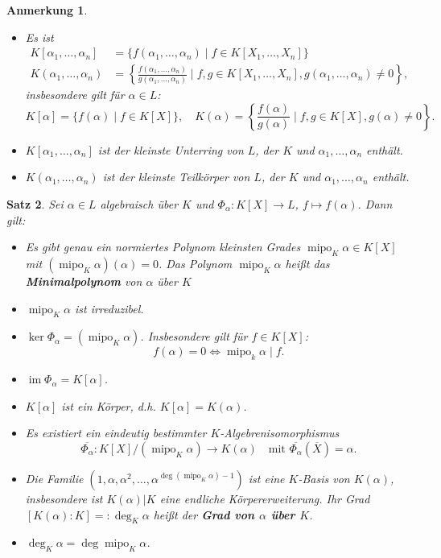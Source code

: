 \documentclass[a4paper, twoside, 11pt, ngerman]{report}
\DeclareMathOperator{\image}{im}
\DeclareMathOperator{\mipo}{mipo}
\theoremstyle{definistyle}
\newtheorem{satz}{Satz}[section]
\newtheorem{anm}[satz]{Anmerkung}
\theoremstyle{remark}
\newcommand{\defn}[1]{\textit{\bfseries #1}}
\begin{document}
\begin{anm}
\begin{itemize}
\item Es ist
\begin{align*}
K[\alpha_1,\ldots,\alpha_n]&=\{f(\alpha_1,\ldots,\alpha_n)\mid f\in K[X_1,\ldots,X_n]\}\\
K(\alpha_1,\ldots,\alpha_n)&=\left\{\frac{f(\alpha_1,\ldots,\alpha_n)}{g(\alpha_1,\ldots,\alpha_n)} \mid f,g\in K[X_1,\ldots,X_n], g(\alpha_1,\ldots,\alpha_n)\neq 0\right\},
\end{align*}
insbesondere gilt für $\alpha\in L$:
    \[K[\alpha] = \{f(\alpha) \mid f \in K[X]\}, \quad K(\alpha) = \left\{\frac{f(\alpha)}{g(\alpha)} \mid f, g \in K[X], g(\alpha) \neq 0 \right\}.\]
    \item $K[\alpha_1, \dots, \alpha_n]$ ist der kleinste Unterring von $L$, der $K$ und $\alpha_1, \dots, \alpha_n$ enthält.
    \item $K(\alpha_1, \dots, \alpha_n)$ ist der kleinste Teilkörper von $L$, der $K$ und $\alpha_1, \dots, \alpha_n$ enthält.
\end{itemize}
\end{anm}

\begin{satz}\label{satz:minimalpolynom}
Sei $\alpha \in L$ algebraisch über $K$ und $\Phi_\alpha : K[X] \to L$, $f \mapsto f(\alpha)$. Dann gilt:
\begin{itemize}
    \item[(a)] Es gibt genau ein normiertes Polynom kleinsten Grades $\mipo_K\alpha \in K[X]$ mit $(\mipo_K\alpha)(\alpha) = 0$. Das Polynom $\mipo_K\alpha$ heißt das \defn{Minimalpolynom} von $\alpha$ über $K$
    \item[(b)] $\mipo_K\alpha$ ist irreduzibel.
     \item[(c)] $\ker \Phi_\alpha = (\mipo_K\alpha)$. Insbesondere gilt für $f\in K[X]$: 
     \[
     f(\alpha)=0\iff \mipo_k\alpha\mid f.
     \]
    \item[(d)] $\image \Phi_\alpha = K[\alpha]$.
    \item[(e)] $K[\alpha]$ ist ein Körper, d.h. $K[\alpha] = K(\alpha)$.
    \item[(f)] Es existiert ein eindeutig bestimmter $K$-Algebrenisomorphismus
    \[
    \overline{\Phi_\alpha}\colon K[X] / (\mipo_K\alpha) \to K(\alpha) \quad \text{mit } \overline{\Phi_\alpha}(\overline{X})=\alpha.
    \]
    \item[(g)] Die Familie $(1, \alpha, \alpha^2, \dots, \alpha^{\deg(\mipo_K\alpha)-1})$ ist eine $K$-Basis von $K(\alpha)$, insbesondere ist $K(\alpha)|K$ eine endliche Körpererweiterung. Ihr Grad $[K(\alpha) : K]=:\deg_K\alpha$ heißt der \defn{Grad von $\alpha$ über $K$}.
    \item[(h)] $\deg_K\alpha = \deg \mipo_K\alpha$.
\end{itemize}
\end{satz}
\end{document}
